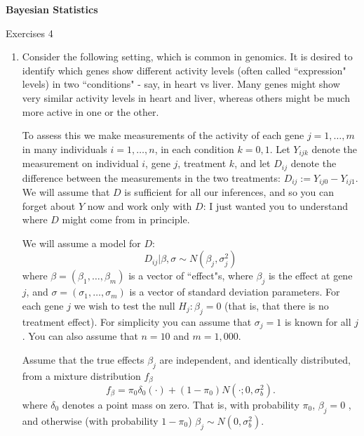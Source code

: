 \documentclass[12pt]{article}
\begin{document}
\begin{center}
{\bf
Bayesian Statistics

\smallskip

Exercises 4
}
\smallskip

\end{center}

\bigskip

\begin{enumerate}

\item Consider the following setting, which is common in genomics. It is desired to identify
which genes show different activity levels (often called ``expression" levels) 
in two ``conditions" - say, in heart vs liver. Many genes might show very similar
activity levels in heart and liver, whereas others might be much more active in one or the other.

To assess this we make measurements of the activity of each gene $j=1,\dots,m$ in many individuals $i=1,\dots,n$, in each condition $k=0,1$.
Let $Y_{ijk}$ denote the
measurement on individual $i$, gene $j$, treatment $k$, and let $D_{ij}$ denote the difference between the measurements
in the two treatments: $D_{ij}:= Y_{ij0}-Y_{ij1}$. We will assume that $D$ is sufficient for all our inferences, and so you can forget about $Y$ now and work
only with $D$: I just wanted you to understand where $D$ might come from in principle.

We will assume a model for $D$:
\begin{equation} \label{eqn:D}
D_{ij} | \beta, \sigma \sim N(\beta_j, \sigma_j^2)
\end{equation}
where $\beta=(\beta_1,\dots,\beta_m)$ is a vector of ``effect"s, where
$\beta_j$ is the effect at gene $j$, and $\sigma=(\sigma_1,\dots,\sigma_m)$ is a vector of 
standard deviation parameters. 
For each gene $j$ we wish to test
the null $H_j: \beta_j=0$ (that is, that there is no treatment effect). For simplicity you can assume that $\sigma_j=1$ is known for all $j$. You can also assume that $n=10$ and $m=1,000$.

Assume that the true effects
$\beta_j$ are independent, and identically distributed, from a mixture distribution $f_\beta$
\begin{equation} \label{eqn:B}
f_\beta =  \pi_0 \delta_0(\cdot) + (1-\pi_0) N(\cdot; 0,\sigma^2_b).
\end{equation}
where $\delta_0$ denotes a point mass on zero.
That is, with probability $\pi_0$, $\beta_j=0$ , and otherwise (with probability $1-\pi_0$) $\beta_j\sim  N(0,\sigma^2_b)$.



\end{enumerate}
\end{document}
